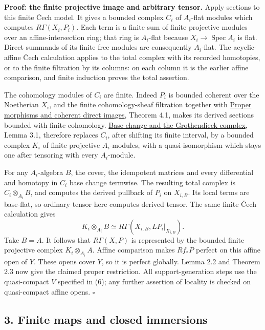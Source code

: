 \documentclass[11pt]{article}
\begin{document}
\textbf{Proof: the finite projective image and arbitrary tensor.} Apply
sections to this finite Čech model. It gives a bounded complex \(C_i\)
of \(A_i\)-flat modules which computes \(R\Gamma(X_i,P_i)\). Each term
is a finite sum of finite projective modules over an affine-intersection
ring; that ring is \(A_i\)-flat because \(X_i\to\operatorname{Spec}A_i\)
is flat. Direct summands of its finite free modules are consequently
\(A_i\)-flat. The acyclic-affine Čech calculation applies to the total
complex with its recorded homotopies, or to the finite filtration by its
columns: on each column it is the earlier affine comparison, and finite
induction proves the total assertion.

The cohomology modules of \(C_i\) are finite. Indeed \(P_i\) is bounded
coherent over the Noetherian \(X_i\), and the finite cohomology-sheaf
filtration together with
\href{proper-morphisms-and-coherent-direct-images.md}{Proper morphisms
and coherent direct images}, Theorem 4.1, makes its derived sections
bounded with finite cohomology.
\href{base-change-and-the-grothendieck-complex.md}{Base change and the
Grothendieck complex}, Lemma 3.1, therefore replaces \(C_i\), after
shifting its finite interval, by a bounded complex \(K_i\) of finite
projective \(A_i\)-modules, with a quasi-isomorphism which stays one
after tensoring with every \(A_i\)-module.

For any \(A_i\)-algebra \(B\), the cover, the idempotent matrices and
every differential and homotopy in \(C_i\) base change termwise. The
resulting total complex is \(C_i\otimes_{A_i}B\), and computes the
derived pullback of \(P_i\) on \(X_{i,B}\). Its local terms are
base-flat, so ordinary tensor here computes derived tensor. The same
finite Čech calculation gives \[
K_i\otimes_{A_i}B
\simeq R\Gamma(X_{i,B},LP_i|_{X_{i,B}}).
\tag{2.B}
\] Take \(B=A\). It follows that \(R\Gamma(X,P)\) is represented by the
bounded finite projective complex \(K_i\otimes_{A_i}A\). Affine
comparison makes \(Rf_*P\) perfect on this affine open of \(Y\). These
opens cover \(Y\), so it is perfect globally. Lemma 2.2 and Theorem 2.3
now give the claimed proper restriction. All support-generation steps
use the quasi-compact \(V\) specified in (6); any further assertion of
locality is checked on quasi-compact affine opens. \(\square\)

\subsection{3. Finite maps and closed
immersions}\label{finite-maps-and-closed-immersions}
\end{document}
